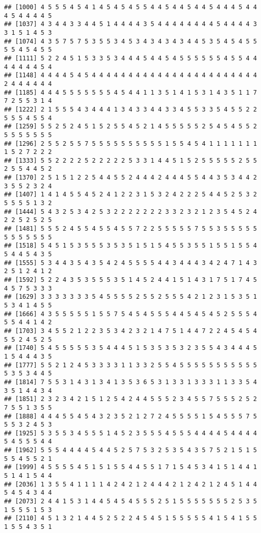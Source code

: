 \documentclass[
]{article}
\begin{document}
\begin{verbatim}
## [1000] 4 5 5 5 4 5 4 1 4 5 4 5 4 5 5 4 4 5 4 4 5 4 4 5 4 4 4 5 4 4 4 5 4 4 4 4 5
## [1037] 4 3 4 4 3 3 4 4 5 1 4 4 4 4 3 5 4 4 4 4 4 4 4 4 5 4 4 4 4 3 3 1 5 1 4 5 3
## [1074] 4 3 5 7 5 7 5 3 5 5 3 4 5 3 4 3 4 3 4 3 4 4 5 3 5 4 5 4 5 5 5 5 4 5 4 5 5
## [1111] 5 2 2 4 5 1 5 3 3 5 3 4 4 4 5 4 4 5 4 5 5 5 5 5 5 4 5 5 4 4 4 4 4 4 4 5 4
## [1148] 4 4 4 4 5 4 5 4 4 4 4 4 4 4 4 4 4 4 4 4 4 4 4 4 4 4 4 4 4 4 2 4 4 4 4 4 4
## [1185] 4 4 4 5 5 5 5 5 5 5 4 5 4 4 1 1 3 5 1 4 1 5 3 1 4 3 5 1 1 7 7 2 5 5 3 1 4
## [1222] 2 1 5 5 5 4 3 4 4 4 1 3 4 3 3 4 4 3 3 4 5 5 3 3 5 4 5 5 2 2 5 5 5 4 5 5 4
## [1259] 5 5 2 5 2 4 5 1 5 2 5 5 4 5 2 1 4 5 5 5 5 5 2 5 4 5 4 5 5 2 5 5 5 5 5 5 5
## [1296] 2 5 5 2 5 5 7 5 5 5 5 5 5 5 5 5 5 1 5 5 4 5 4 1 1 1 1 1 1 1 1 5 2 7 2 2 2
## [1333] 5 5 2 2 2 2 5 2 2 2 2 2 5 3 3 1 4 4 5 1 5 2 5 5 5 5 5 2 5 5 2 5 5 4 4 5 2
## [1370] 2 5 1 5 1 2 2 5 4 4 5 5 2 4 4 4 2 4 4 4 5 5 4 4 3 5 3 4 4 2 3 5 5 2 3 2 4
## [1407] 1 4 1 4 5 5 4 5 2 4 1 2 2 3 1 5 3 2 4 2 2 2 5 4 4 5 2 5 3 2 5 5 5 5 1 3 2
## [1444] 5 4 3 2 5 3 4 2 5 3 2 2 2 2 2 2 2 3 3 2 3 2 1 2 3 5 4 5 2 4 2 2 5 2 5 2 5
## [1481] 5 5 5 2 4 5 5 4 5 5 4 5 5 7 2 2 5 5 5 5 5 7 5 5 3 5 5 5 5 5 5 5 5 5 5 5 5
## [1518] 5 4 5 1 5 3 5 5 5 3 5 3 5 1 5 1 5 4 5 5 3 5 5 1 5 5 1 5 5 4 5 4 4 5 4 3 5
## [1555] 5 3 4 4 3 5 4 3 5 4 2 4 5 5 5 5 4 4 3 4 4 4 3 4 2 4 7 1 4 3 2 5 1 2 4 1 2
## [1592] 5 2 2 4 3 5 3 5 5 5 3 5 1 4 5 2 4 4 1 5 1 4 3 1 7 5 1 7 4 5 4 5 7 5 3 3 3
## [1629] 3 3 3 3 3 3 3 5 4 5 5 5 5 2 5 5 2 5 5 5 4 2 1 2 3 1 5 3 5 1 5 3 4 1 4 5 5
## [1666] 4 3 5 5 5 5 5 1 5 5 7 5 4 5 4 5 5 5 4 4 5 4 5 4 5 2 5 5 5 4 5 5 4 4 1 4 2
## [1703] 3 4 5 5 2 1 2 2 3 5 3 4 2 3 2 1 4 7 5 1 4 4 7 2 2 4 5 4 5 4 5 5 2 4 5 2 5
## [1740] 5 4 5 5 5 5 5 3 5 4 4 4 5 1 5 3 5 3 5 3 2 3 5 5 4 3 4 4 4 5 1 5 4 4 4 3 5
## [1777] 5 5 2 1 2 4 5 3 3 3 3 1 1 3 3 2 5 5 4 5 5 5 5 5 5 5 5 5 5 5 5 3 5 3 4 4 5
## [1814] 7 5 5 3 1 4 3 1 3 4 1 3 5 3 6 5 3 1 3 3 1 3 3 3 1 1 3 3 5 4 3 5 1 4 4 3 4
## [1851] 2 3 2 3 4 2 1 5 1 2 5 4 2 4 4 5 5 5 2 3 4 5 5 7 5 5 5 2 5 2 7 5 5 1 3 5 5
## [1888] 4 4 4 5 5 4 5 4 3 2 3 5 2 1 2 7 2 4 5 5 5 5 1 5 4 5 5 5 7 5 5 5 3 2 4 5 3
## [1925] 5 3 5 5 3 4 5 5 5 1 4 5 2 3 5 5 5 4 5 5 5 4 4 4 4 5 4 4 4 4 5 4 5 5 5 4 4
## [1962] 5 5 5 4 4 4 4 5 4 4 5 2 5 7 5 3 2 5 3 5 4 3 5 7 5 2 1 5 1 5 5 5 4 5 5 2 1
## [1999] 4 5 5 5 5 4 5 1 5 1 5 5 4 4 5 5 1 7 1 5 4 5 3 4 1 5 1 4 4 1 5 1 4 1 5 4 4
## [2036] 1 3 5 5 4 1 1 1 1 4 2 4 2 1 2 4 4 4 2 1 2 4 2 1 2 4 5 1 4 4 5 4 5 4 3 4 4
## [2073] 2 4 4 1 5 3 1 4 4 5 4 5 4 5 5 5 2 5 1 5 5 5 5 5 5 5 2 5 3 5 1 5 5 5 1 5 3
## [2110] 4 5 1 3 2 1 4 4 5 2 5 2 2 4 5 4 5 1 5 5 5 5 5 4 1 5 4 1 5 5 1 5 5 4 3 5 1

\end{verbatim}
\end{document}
